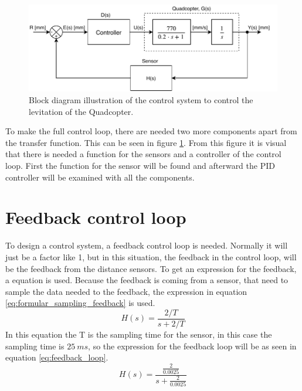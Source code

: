  \begin{figure}[H]
     \centering
     \includegraphics[width=\textwidth]{figures/ch_design/controller/ControlDiagramTF.pdf}
     \caption{Block diagram illustration of the control system  to control the levitation of the Quadcopter.}
     \label{fig:controlDiagram}
 \end{figure}

To make the full control loop, there are needed two more components apart from the transfer function. This can be seen in figure \ref{fig:controlDiagram}. From this figure it is visual that there is needed a function for the sensors and a controller of the control loop. 
First the function for the sensor will be found and afterward the PID controller will be examined with all the components.


\section{Feedback control loop}\label{s:feedback_loop}
To design a control system, a feedback control loop is needed. Normally it will just be a factor like 1, but in this situation, the feedback in the control loop, will be the feedback from the distance sensors. To get an expression for the feedback, a equation is used. Because the feedback is coming from a sensor, that need to sample the data needed to the feedback, the expression in equation \ref{eq:formular_sampling_feedback} is used.
\begin{equation}\label{eq:formular_sampling_feedback}
    H(s)=\frac{2/T}{s+2/T}
\end{equation}
In this equation the T is the sampling time for the sensor, in this case the sampling time is $25\ ms$, so the expression for the feedback loop will be as seen in equation \ref{eq:feedback_loop}.
\begin{equation}\label{eq:feedback_loop}
    H(s)=\frac{\frac{2}{0.0025}}{s+\frac{2}{0.0025}}
\end{equation}

